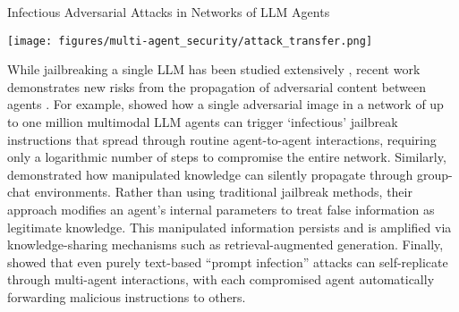\begin{case-study}[label=cs:infectious_attacks]{Infectious Adversarial Attacks in Networks of LLM Agents}
    \begin{center}
        \texttt{[image: figures/multi-agent\_security/attack\_transfer.png]}
    \end{center}
    \vspace{1em}
    While jailbreaking a single LLM has been studied extensively \citep{Xu2024, doumbouya2024h4rm3ldynamicbenchmarkcomposable}, recent work demonstrates new risks from the propagation of adversarial content between agents \citep{Gu2024, Ju2024, Lee2024}.
    For example, \citet{Gu2024} showed how a single adversarial image in a network of up to one million multimodal LLM agents can trigger `infectious' jailbreak instructions that spread through routine agent-to-agent interactions, requiring only a logarithmic number of steps to compromise the entire network.
    Similarly, \citet{Ju2024} demonstrated how manipulated knowledge can silently propagate through group-chat environments.
    Rather than using traditional jailbreak methods, their approach modifies an agent's internal parameters to treat false information as legitimate knowledge.
    This manipulated information persists and is amplified via knowledge-sharing mechanisms such as retrieval-augmented generation. 
    Finally, \citet{Lee2024} showed that even purely text-based ``prompt infection'' attacks can self-replicate through multi-agent interactions, with each compromised agent automatically forwarding malicious instructions to others.
\end{case-study}

